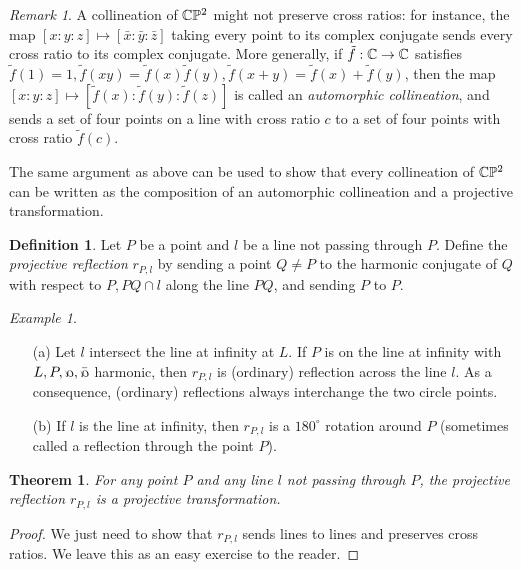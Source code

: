 \documentclass[letterpaper,11pt]{article}
\newtheorem{thm}{Theorem}
\theoremstyle{definition}
\newtheorem{defn}{Definition}
\theoremstyle{remark}
\newtheorem{ex}{Example}
\newtheorem{rmk}{Remark}
\begin{document}
\begin{rmk} A collineation of $\mathbb{C}\mathbb{P}^2$ might not preserve cross ratios: for instance, the map $[x:y:z] \mapsto [\bar{x}:\bar{y}:\bar{z}]$ taking every point to its complex conjugate sends every cross ratio to its complex conjugate. More generally, if $\tilde{f}:\mathbb{C}\rightarrow\mathbb{C}$ satisfies $\tilde{f}(1) = 1, \tilde{f}(xy) = \tilde{f}(x)\tilde{f}(y), \tilde{f}(x+y) = \tilde{f}(x)+\tilde{f}(y)$, then the map $[x:y:z] \mapsto [\tilde{f}(x):\tilde{f}(y):\tilde{f}(z)]$ is called an \emph{automorphic collineation}, and sends a set of four points on a line with cross ratio $c$ to a set of four points with cross ratio $\tilde{f}(c)$.

The same argument as above can be used to show that every collineation of $\mathbb{C}\mathbb{P}^2$ can be written as the composition of an automorphic collineation and a projective transformation.
\end{rmk}

\begin{defn} Let $P$ be a point and $l$ be a line not passing through $P$. Define the \emph{projective reflection} $r_{P,l}$ by sending a point $Q \ne P$ to the harmonic conjugate of $Q$ with respect to $P, PQ \cap l$ along the line $PQ$, and sending $P$ to $P$.
\end{defn}

\begin{ex}
\begin{itemize}
\item[(a)] Let $l$ intersect the line at infinity at $L$. If $P$ is on the line at infinity with $L,P,\fish,\bar\fish$ harmonic, then $r_{P,l}$ is (ordinary) reflection across the line $l$. As a consequence, (ordinary) reflections always interchange the two circle points.

\item[(b)] If $l$ is the line at infinity, then $r_{P,l}$ is a $180^\circ$ rotation around $P$ (sometimes called a reflection through the point $P$).
\end{itemize}
\end{ex}

\begin{thm} For any point $P$ and any line $l$ not passing through $P$, the projective reflection $r_{P,l}$ is a projective transformation.
\end{thm}
\begin{proof} We just need to show that $r_{P,l}$ sends lines to lines and preserves cross ratios. We leave this as an easy exercise to the reader.
\end{proof}
\end{document}
